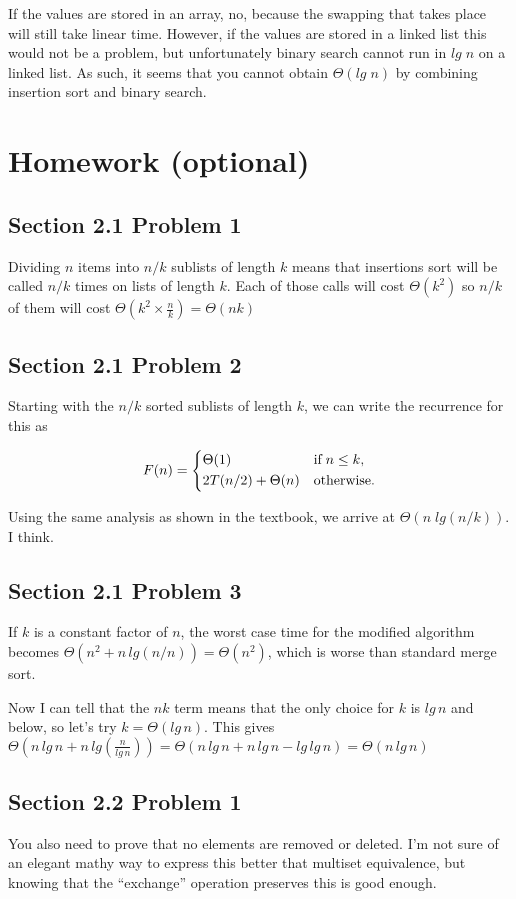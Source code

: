 \documentclass[12pt,letterpaper]{article}
\begin{document}
If the values are stored in an array, no, because the swapping that takes place will still take
linear time. However, if the values are stored in a linked list this would not be a problem, but
unfortunately binary search cannot run in $lg\;n$ on a linked list. As such, it seems that you cannot
obtain $\Theta(lg\;n)$ by combining insertion sort and binary search.

\section{Homework (optional)}

\subsection{Section 2.1 Problem 1}

Dividing $n$ items into $n/k$ sublists of length $k$ means that insertions sort will be called $n/k$
times on lists of length $k$. Each of those calls will cost $\Theta(k^2)$ so $n/k$ of them will cost
$\Theta(k^2 \times \frac{n}{k}) = \Theta(nk)$

\subsection{Section 2.1 Problem 2}

Starting with the $n/k$ sorted sublists of length $k$, we can write the recurrence for this as 

\[
    F(n) = 
    \begin{dcases}
        \Theta(1) & \text{if}\;n\leq k, \\
        2T(n/2) + \Theta(n) & \text{otherwise}. \\
    \end{dcases}
\]

Using the same analysis as shown in the textbook, we arrive at $\Theta(n\;lg(n/k))$. I think.

\subsection{Section 2.1 Problem 3}

If $k$ is a constant factor of $n$, the worst case time for the modified algorithm becomes 
$\Theta(n^2+n\,lg(n/n)) = \Theta(n^2)$, which is worse than standard merge sort.

Now I can tell that the $nk$ term means that the only choice for $k$ is $lg\,n$ and below, so let's
try $k = \Theta(lg\,n)$. This gives 
$\Theta(n\,lg\,n+n\,lg(\frac{n}{lg\,n})) = \Theta(n\,lg\,n+n\,lg\,n - lg\,lg\,n) = \Theta(n\,lg\,n)
$

\subsection{Section 2.2 Problem 1}

You also need to prove that no elements are removed or deleted. I'm not sure of an elegant mathy way
to express this better that multiset equivalence, but knowing that the ``exchange'' operation
preserves this is good enough.
\end{document}
